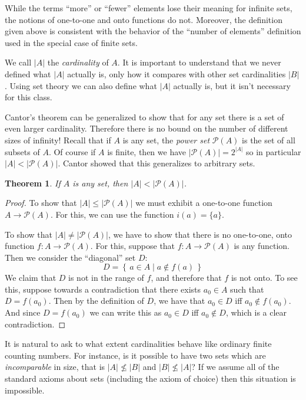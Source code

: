 \documentclass[11pt,oneside]{amsbook}
\newcommand{\set}[1]{\left\{\,#1\,\right\}}
\theoremstyle{definition}
\theoremstyle{plain}
\newtheorem{thm}{Theorem}[section]
\theoremstyle{definition}
\theoremstyle{remark}
\numberwithin{equation}{section}
\numberwithin{figure}{section}
\begin{document}
While the terms ``more'' or ``fewer'' elements lose their meaning for infinite sets, the notions of one-to-one and onto functions do not. Moreover, the definition given above is consistent with the behavior of the ``number of elements'' definition used in the special case of finite sets.

We call $|A|$ the \emph{cardinality} of $A$. It is important to understand that we never defined what $|A|$ actually is, only how it compares with other set cardinalities $|B|$. Using set theory we can also define what $|A|$ actually is, but it isn't necessary for this class.

Cantor's theorem can be generalized to show that for any set there is a set of even larger cardinality. Therefore there is no bound on the number of different sizes of infinity! Recall that if $A$ is any set, the \emph{power set} $\mathcal P(A)$ is the set of all subsets of $A$. Of course if $A$ is finite, then we have $|\mathcal P(A)|=2^{|A|}$ so in particular $|A|<|\mathcal P(A)|$. Cantor showed that this generalizes to arbitrary sets.

\begin{thm}
  If $A$ is any set, then $|A|<|\mathcal P(A)|$.
\end{thm}

\begin{proof}
  To show that $|A|\leq|\mathcal P(A)|$ we must exhibit a one-to-one function $A\to\mathcal P(A)$. For this, we can use the function $i(a)=\{a\}$.

  To show that $|A|\neq|\mathcal P(A)|$, we have to show that there is no one-to-one, onto function $f\colon A\to\mathcal P(A)$. For this, suppose that $f\colon A\to\mathcal P(A)$ is any function. Then we consider the ``diagonal'' set $D$:
  \[D=\set{a\in A\mid a\notin f(a)}
  \]
  We claim that $D$ is not in the range of $f$, and therefore that $f$ is not onto. To see this, suppose towards a contradiction that there exists $a_0\in A$ such that $D=f(a_0)$. Then by the definition of $D$, we have that $a_0\in D$ iff $a_0\notin f(a_0)$. And since $D=f(a_0)$ we can write this as $a_0\in D$ iff $a_0\notin D$, which is a clear contradiction.
\end{proof}

It is natural to ask to what extent cardinalities behave like ordinary finite counting numbers. For instance, is it possible to have two sets which are \emph{incomparable} in size, that is $|A|\not\leq|B|$ and $|B|\not\leq|A|$? If we assume all of the standard axioms about sets (including the axiom of choice) then this situation is impossible.
\end{document}
